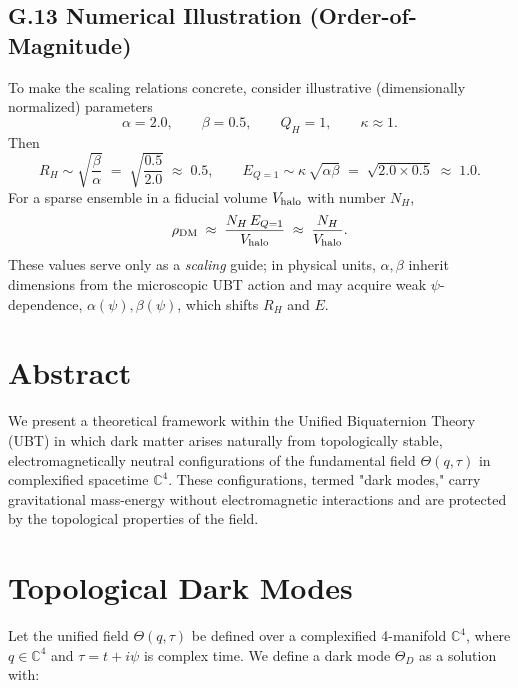 \subsection*{G.13 Numerical Illustration (Order-of-Magnitude)}
To make the scaling relations concrete, consider illustrative (dimensionally normalized) parameters
\begin{equation}
\alpha = 2.0,\qquad \beta = 0.5,\qquad Q_H=1,\qquad \kappa \approx 1.
\end{equation}
Then
\begin{equation}
R_H \sim \sqrt{\frac{\beta}{\alpha}} \;=\; \sqrt{\frac{0.5}{2.0}} \;\approx\; 0.5,\qquad
E_{Q=1} \sim \kappa\,\sqrt{\alpha\beta} \;=\; \sqrt{2.0\times 0.5} \;\approx\; 1.0.
\end{equation}
For a sparse ensemble in a fiducial volume $V_{\rm halo}$ with number $N_H$,
\begin{equation}
\rho_{\rm DM} \;\approx\; \frac{N_H\,E_{Q=1}}{V_{\rm halo}} \;\approx\; \frac{N_H}{V_{\rm halo}}.
\end{equation}
These values serve only as a \emph{scaling} guide; in physical units, $\alpha,\beta$ inherit dimensions from the microscopic UBT action and may acquire weak $\psi$-dependence, $\alpha(\psi),\beta(\psi)$, which shifts $R_H$ and $E$.



\section*{Abstract}
We present a theoretical framework within the Unified Biquaternion Theory (UBT) in which dark matter arises naturally from topologically stable, electromagnetically neutral configurations of the fundamental field \( \Theta(q, \tau) \) in complexified spacetime \( \mathbb{C}^4 \). These configurations, termed "dark modes," carry gravitational mass-energy without electromagnetic interactions and are protected by the topological properties of the field.

\section{Topological Dark Modes}
Let the unified field \( \Theta(q, \tau) \) be defined over a complexified 4-manifold \( \mathbb{C}^4 \), where \( q \in \mathbb{C}^4 \) and \( \tau = t + i\psi \) is complex time. We define a dark mode \( \Theta_D \) as a solution with:

